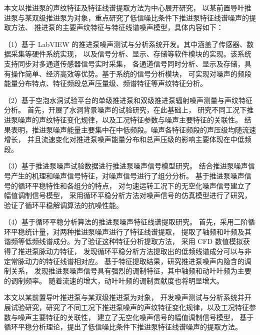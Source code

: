 本文以推进泵的声纹特征及特征线谱提取方法为中心展开研究，
以某前置导叶推进泵与某双级推进泵为对象，重点研究了低信噪比条件下推进泵特征线谱噪声的提取方法、
推进泵的主要声纹特征与特征线谱噪声模型，具体内容如下：

（1）基于 LabVIEW 的推进泵噪声测试与分析系统开发。其中涵盖了传感器、数据采集等硬件系统实现，
以及信号分析、显示、存储等软件模块的实现。该系统支持同步对多通道传感器信号实时采集，
各通道信号同时分析、显示及存储，具有操作简单、经济高效等优势。基于系统的信号分析模块，
可实现对噪声的频段能量分布特点、特征频段总声压量级、频谱特征等声纹特征分析。

（2）基于空泡水洞试验平台的单级推进泵和双级推进泵辐射噪声测量与声纹特征分析。
首先，开展了水洞背景噪声的试验研究，在此基础上，
研究不同工况下推进泵噪声的声纹特征变化规律，以及工况特征参数与噪声主要特征的关联性。
结果表明，推进泵噪声能量主要集中在中低频段。噪声各特征频段的声压级均随流速增长，
并且流速变化对推进泵噪声能量分布和总声压级的影响主要体现在中低频段。

（3）基于推进泵噪声试验数据进行推进泵噪声信号模型研究。
结合推进泵噪声信号产生的机理和噪声信号特征，对噪声信号进行了组分分析。
基于推进泵噪声信号的循环平稳特性和各组分的特点，
对匀速运转工况下的无空化噪声信号建立了幅值调制信号模型，
采用循环平稳分析方法对噪声信号的仿真模型进行了研究，
验证了循环平稳解调算法的抗噪性能。 

（4）基于循环平稳分析算法的推进泵噪声特征线谱提取研究。
首先，采用二阶循环平稳统计量，对两种推进泵噪声进行了特征线谱提取，
提取了轴频和叶频及其谐频等低频线谱成分。为了验证这种特征分析提取方法，
采用 CFD 数值模拟获得了推进泵脉动力特征，
发现循环平稳分析方法提取出的低频线谱成分可以与非定常脉动力的特征线谱相对应。
基于特征提取结果，研究推进泵噪声内隐含的调制关系，
发现推进泵噪声信号具有强烈的调制特征，其中轴频和动叶叶频为主要的调制频率。
随着流速的增大，动叶叶频的调制贡献度也将明显增大。

本文以某前置导叶推进泵与某双级推进泵为对象，
开发噪声测试与分析系统并开展试验研究，研究了不同工况下推进泵噪声的声纹特征变化规律，以及工况特征参数与噪声主要特征的关联性，
建立了无空化噪声信号的幅值调制信号模型，
基于循环平稳分析理论，提出了低信噪比条件下推进泵特征线谱噪声的提取方法。

\quad

